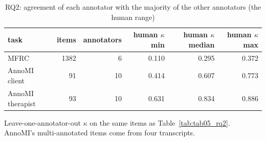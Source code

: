 \begin{table}[t]
\centering
\small
\caption{RQ2: agreement of each annotator with the majority of the other annotators (the human range)}
\label{tab:tab05b_rq2_humans}
\begin{adjustbox}{max width=\linewidth}
\begin{tabular}{lrrrrr}
\toprule
task & items & annotators & human $\kappa$ min & \makecell[br]{human $\kappa$ \\{} median} & human $\kappa$ max \\
\midrule
MFRC & 1382 & 6 & 0.110 & 0.295 & 0.372 \\
AnnoMI client & 91 & 10 & 0.414 & 0.607 & 0.773 \\
AnnoMI therapist & 93 & 10 & 0.631 & 0.834 & 0.886 \\
\bottomrule
\end{tabular}
\end{adjustbox}
\par\smallskip\footnotesize\raggedright Leave-one-annotator-out $\kappa$ on the same items as Table~\ref{tab:tab05_rq2}. AnnoMI's multi-annotated items come from four transcripts.
\end{table}
